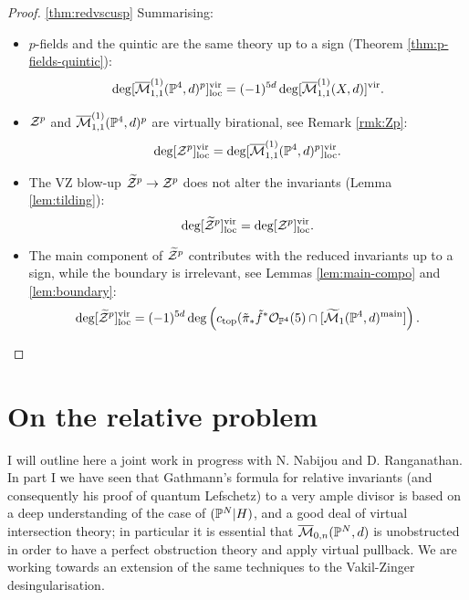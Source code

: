 \begin{proof}\ref{thm:redvscusp}
Summarising:
\begin{itemize}[leftmargin=.5cm]
\item $p$-fields and the quintic are the same theory up to a sign (Theorem \ref{thm:p-fields-quintic}): \[\deg[\overline{\mathcal M}^{(1)}_{1,1}(\mathbb P^4,d)^p]^{\rm{vir}}_{\rm{loc}}= (-1)^{5d}\deg[\overline{\mathcal M}^{(1)}_{1,1}(X,d)]^{\rm{vir}}.\]
\item $\mathcal Z^p$ and $\overline{\mathcal M}^{(1)}_{1,1}(\mathbb P^4,d)^p$ are virtually birational, see Remark \ref{rmk:Zp}:
\[\deg[\mathcal Z^p]^{\mathrm{vir}}_{\mathrm{loc}}=\deg[\overline{\mathcal M}^{(1)}_{1,1}(\mathbb P^4,d)^p]^{\mathrm{vir}}_{\mathrm{loc}}.\]
\item The VZ blow-up $\widetilde{\mathcal Z}^p\rightarrow \mathcal Z^p$ does not alter the invariants (Lemma \ref{lem:tilding}): \[\deg[\widetilde{\mathcal Z}^p]^{\mathrm{vir}}_{\mathrm{loc}}=\deg[\mathcal Z^p]^{\mathrm{vir}}_{\mathrm{loc}}.\]
\item The main component of $\widetilde{\mathcal Z}^p$ contributes with the reduced invariants up to a sign, while the boundary is irrelevant, see Lemmas \ref{lem:main-compo} and \ref{lem:boundary}:
\[\deg[\widetilde{\mathcal Z}^p]^{\mathrm{vir}}_{\mathrm{loc}}=(-1)^{5d}\deg\left(c_{\rm{top}}(\tilde\pi_*\tilde f^*\mathcal{O}_{\mathbb P^4}(5)\cap[\widetilde{\mathcal M}_1(\mathbb P^4,d)^{\rm{main}}]\right).\]
\end{itemize}


\end{proof}
\section{On the relative problem}
I will outline here a joint work in progress with N. Nabijou and D. Ranganathan. In part I we have seen that Gathmann's formula for relative invariants (and consequently his proof of quantum Lefschetz) to a very ample divisor is based on a deep understanding of the case of $(\mathbb P^N|H)$, and a good deal of virtual intersection theory; in particular it is essential that $\overline{\mathcal{M}}_{0,n}(\mathbb P^N,d)$ is unobstructed in order to have a perfect obstruction theory and apply virtual pullback. We are working towards an extension of the same techniques to the Vakil-Zinger desingularisation.
